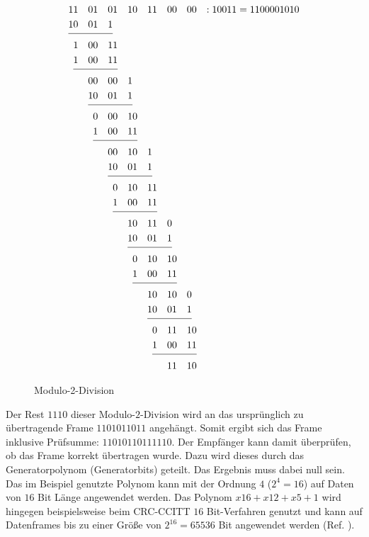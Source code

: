 \begin{figure}[H]
\jot-0.6mm
\begin{alignat*}{14}
1&1&0&1&0&1&1&0&1&1&0&0&0&0& : 10011=1100001010 \\
1&0&0&1&1\\ \cline{1-5}
&1&0&0&1&1& \\ 
&1&0&0&1&1& \\ \cline{2-6}
&&0&0&0&0&1& \\ 
&&1&0&0&1&1& \\ \cline{3-7}
&&&0&0&0&1&0& \\                                                 
&&&1&0&0&1&1& \\ \cline{4-8}
&&&&0&0&1&0&1& \\                                               
&&&&1&0&0&1&1& \\ \cline{5-9}
&&&&&0&1&0&1&1& \\                                           
&&&&&1&0&0&1&1&  \\ \cline{6-10}                                                                                  
&&&&&&1&0&1&1&0& \\                                           
&&&&&&1&0&0&1&1& \\   \cline{7-11}                                                                                      
&&&&&&&0&1&0&1&0& \\                                         
&&&&&&&1&0&0&1&1& \\ \cline{8-12}                                                                                     
&&&&&&&&1&0&1&0&0& \\                                       
&&&&&&&&1&0&0&1&1& \\ \cline{9-13}                                                                               
&&&&&&&&&0&1&1&1&0& \\                                     
&&&&&&&&&1&0&0&1&1& \\ \cline{10-14}    
&&&&&&&&&&1&1&1&0& 
\end{alignat*}
\caption{Modulo-2-Division} 
\end{figure}

Der Rest $1110$ dieser Modulo-$2$-Division wird an das
urspr{\"u}nglich zu {\"u}bertragende Frame $11 0101 1011$ angeh{\"a}ngt. Somit
ergibt sich das Frame inklusive Pr{\"u}fsumme: $11 0101 1011 1110$. Der
Empf{\"a}nger kann damit {\"u}berpr{\"u}fen, ob das Frame korrekt {\"u}bertragen
wurde. Dazu wird dieses durch das Generatorpolynom (Generatorbits) geteilt.
Das Ergebnis muss dabei null sein. Das im Beispiel genutzte Polynom kann mit der
Ordnung $4$ ($2^4=16$) auf Daten von $16$ Bit Länge angewendet werden. Das
Polynom $x16+x12+x5+1$ wird hingegen beispielsweise beim CRC-CCITT $16$ Bit-Verfahren
genutzt und kann auf Datenframes bis zu einer Gr{\"o}{\ss}e von $2^{16}=65536$
Bit angewendet werden (Ref. \cite{web2}).

